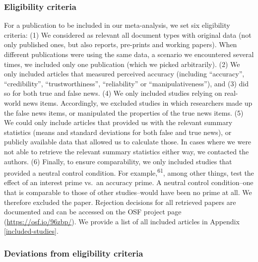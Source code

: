 \documentclass[
  doc,floatsintext]{apa6}
\begin{document}
\subsubsection{Eligibility criteria}\label{eligibility-criteria}

For a publication to be included in our meta-analysis, we set six eligibility criteria: (1) We considered as relevant all document types with original data (not only published ones, but also reports, pre-prints and working papers). When different publications were using the same data, a scenario we encountered several times, we included only one publication (which we picked arbitrarily). (2) We only included articles that measured perceived accuracy (including ``accuracy'', ``credibility'', ``trustworthiness'', ``reliability'' or ``manipulativeness''), and (3) did so for both true and false news. (4) We only included studies relying on real-world news items. Accordingly, we excluded studies in which researchers made up the false news items, or manipulated the properties of the true news items. (5) We could only include articles that provided us with the relevant summary statistics (means and standard deviations for both false and true news), or publicly available data that allowed us to calculate those. In cases where we were not able to retrieve the relevant summary statistics either way, we contacted the authors. (6) Finally, to ensure comparability, we only included studies that provided a neutral control condition. For example,\textsuperscript{61}, among other things, test the effect of an interest prime vs.~an accuracy prime. A neutral control condition--one that is comparable to those of other studies--would have been no prime at all. We therefore excluded the paper. Rejection decisions for all retrieved papers are documented and can be accessed on the OSF project page (\url{https://osf.io/96zbp/}). We provide a list of all included articles in Appendix \ref{included-studies}.

\subsubsection{Deviations from eligibility criteria}\label{deviations-from-eligibility-criteria}
\end{document}
